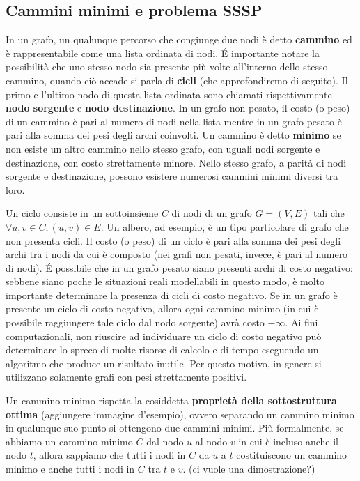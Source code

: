 \documentclass[a4paper]{article}
\begin{document}
	\subsection{Cammini minimi e problema SSSP}
	\label{section:sssp}
	In un grafo, un qualunque percorso che congiunge due nodi è detto \textbf{cammino} ed è rappresentabile come una lista ordinata di nodi. \'E importante notare la possibilità che uno stesso nodo sia presente più volte all'interno dello stesso cammino, quando ciò accade si parla di \textbf{cicli} (che approfondiremo di seguito). Il primo e l'ultimo nodo di questa lista ordinata sono chiamati rispettivamente \textbf{nodo sorgente} e \textbf{nodo destinazione}. In un grafo non pesato, il costo (o peso) di un cammino è pari al numero di nodi nella lista mentre in un grafo pesato è pari alla somma dei pesi degli archi coinvolti. Un cammino è detto \textbf{minimo} se non esiste un altro cammino nello stesso grafo, con uguali nodi sorgente e destinazione, con costo strettamente minore. Nello stesso grafo, a parità di nodi sorgente e destinazione, possono esistere numerosi cammini minimi diversi tra loro.
	
	Un ciclo consiste in un sottoinsieme $C$ di nodi di un grafo $G=(V,E)$ tali che $\forall u,v \in C, (u,v) \in E$. Un albero, ad esempio, è un tipo particolare di grafo che non presenta cicli. Il costo (o peso) di un ciclo è pari alla somma dei pesi degli archi tra i nodi da cui è composto (nei grafi non pesati, invece, è pari al numero di nodi). \'E possibile che in un grafo pesato siano presenti archi di costo negativo: sebbene siano poche le situazioni reali modellabili in questo modo, è molto importante determinare la presenza di cicli di costo negativo. Se in un grafo è presente un ciclo di costo negativo, allora ogni cammino minimo (in cui è possibile raggiungere tale ciclo dal nodo sorgente) avrà costo $-\infty$. Ai fini computazionali, non riuscire ad individuare un ciclo di costo negativo può determinare lo spreco di molte risorse di calcolo e di tempo eseguendo un algoritmo che produce un risultato inutile. Per questo motivo, in genere si utilizzano solamente grafi con pesi strettamente positivi.
	
	Un cammino minimo rispetta la cosiddetta \textbf{proprietà della sottostruttura ottima} (aggiungere immagine d'esempio), ovvero separando un cammino minimo in qualunque suo punto si ottengono due cammini minimi. Più formalmente, se abbiamo un cammino minimo $C$ dal nodo $u$ al nodo $v$ in cui è incluso anche il nodo $t$, allora sappiamo che tutti i nodi in $C$ da $u$ a $t$ costituiscono un cammino minimo e anche tutti i nodi in $C$ tra $t$ e $v$. (ci vuole una dimostrazione?)
	
\end{document}
